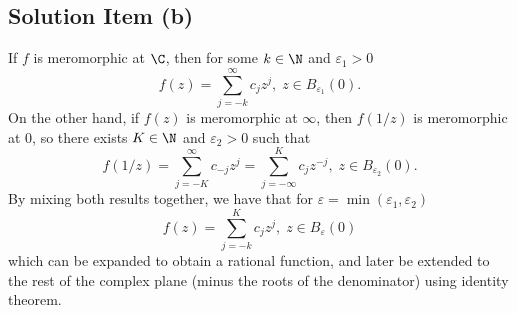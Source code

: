 \subsection*{Solution Item (b)}

If $f$ is meromorphic at $\C$, then for some $k \in \N$ and $\varepsilon_1 > 0$
\[ f(z) = \sum_{j = -k}^{\infty} c_j z^j,\; z\in B_{\varepsilon_1}(0). \]
On the other hand, if $f(z)$ is meromorphic at $\infty$, then $f(1/z)$ is meromorphic at 0, so there exists $K \in \N$ and $\varepsilon_2 > 0$ such that
\[ f(1/z) = \sum_{j = -K}^{\infty} c_{-j} z^j = \sum_{j = -\infty}^{K} c_{j} z^{-j},\; z\in B_{\varepsilon_2}(0).\]
By mixing both results together, we have that for $\varepsilon = \min (\varepsilon_1, \varepsilon_2)$
\[ f(z) = \sum_{j = -k}^{K} c_j z^j,\; z\in B_\varepsilon(0)\]
which can be expanded to obtain a rational function, and later be extended to the rest of the complex plane (minus the roots of the denominator) using identity theorem. 